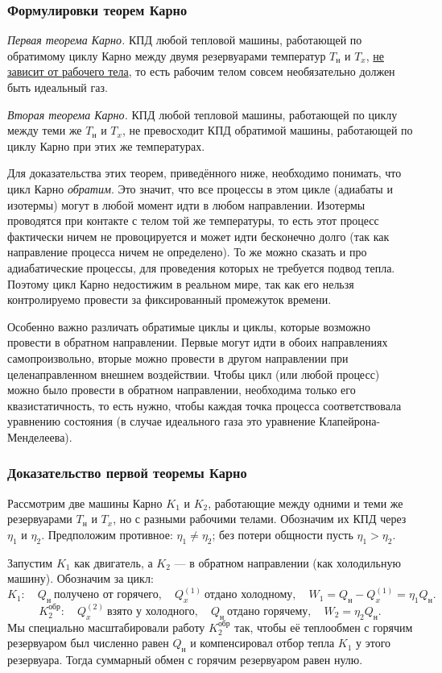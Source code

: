 \documentclass[12pt, a4paper]{article}%
\begin{document}
\subsubsection*{Формулировки теорем Карно}
\textit{Первая теорема Карно.} КПД любой тепловой машины, работающей по обратимому циклу Карно между двумя резервуарами температур $T_{\text{н}}$ и $T_x$, \underline{не зависит от рабочего тела}, то есть рабочим телом совсем необязательно должен быть идеальный газ.

\textit{Вторая теорема Карно.} КПД любой тепловой машины, работающей по циклу между теми же $T_{\text{н}}$ и $T_x$, не превосходит КПД обратимой машины, работающей по циклу Карно при этих же температурах.

Для доказательства этих теорем, приведённого ниже, необходимо понимать, что цикл Карно \textit{обратим}. Это значит, что все процессы в этом цикле (адиабаты и изотермы) могут в любой момент идти в любом направлении. Изотермы проводятся при контакте с телом той же температуры, то есть этот процесс фактически ничем не провоцируется и может идти бесконечно долго (так как направление процесса ничем не определено). То же можно сказать и про адиабатические процессы, для проведения которых не требуется подвод тепла. Поэтому цикл Карно недостижим в реальном мире, так как его нельзя контролируемо провести за фиксированный промежуток времени.

Особенно важно различать обратимые циклы и циклы, которые возможно провести в обратном направлении. Первые могут идти в обоих направлениях самопроизвольно, вторые можно провести в другом направлении при целенаправленном внешнем воздействии. Чтобы цикл (или любой процесс) можно было провести в обратном направлении, необходима только его квазистатичность, то есть нужно, чтобы каждая точка процесса соответствовала уравнению состояния (в случае идеального газа это уравнение Клапейрона-Менделеева).

\subsubsection*{Доказательство первой теоремы Карно}

 Рассмотрим две машины Карно $K_1$ и $K_2$, работающие между одними и теми же резервуарами $T_{\text{н}}$ и $T_x$, но с разными рабочими телами. Обозначим их КПД через $\eta_1$ и $\eta_2$. Предположим противное: $\eta_1\ne\eta_2$; без потери общности пусть $\eta_1>\eta_2$.

Запустим $K_1$ как двигатель, а $K_2$ — в обратном направлении (как холодильную машину). Обозначим за цикл:
\[
K_1:\quad Q_{\text{н}}\ \text{получено от горячего},\quad Q_{x}^{(1)}\ \text{отдано холодному},\quad W_1=Q_{\text{н}}-Q_{x}^{(1)}=\eta_1 Q_{\text{н}}.
\]
\[
K_2^{\text{обр}}:\quad Q_{x}^{(2)}\ \text{взято у холодного},\quad Q_{\text{н}}\ \text{отдано горячему},\quad W_2=\eta_2 Q_{\text{н}}.
\]
Мы специально масштабировали работу $K_2^{\text{обр}}$ так, чтобы её теплообмен с горячим резервуаром был численно равен $Q_{\text{н}}$ и компенсировал отбор тепла $K_1$ у этого резервуара. Тогда суммарный обмен с горячим резервуаром равен нулю.
\end{document}
